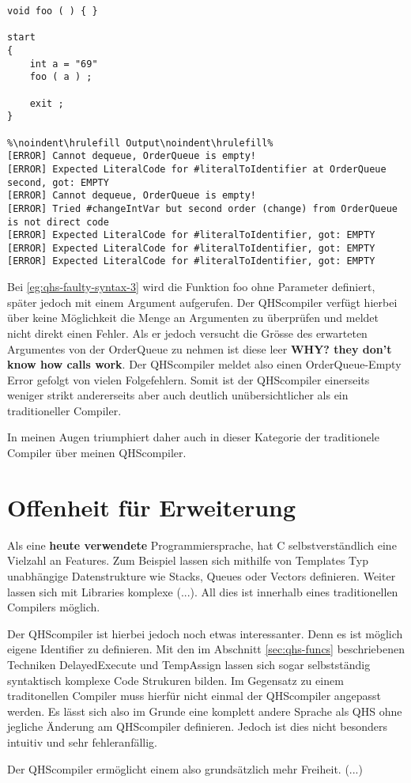 \begin{lstlisting}[language=QHS, caption=QHS mit fehlerhaftem Syntax, label=eg:qhs-faulty-syntax-3]
void foo ( ) { }

start
{
    int a = "69" 
    foo ( a ) ;

    exit ;
}

%\noindent\hrulefill Output\noindent\hrulefill%
[ERROR] Cannot dequeue, OrderQueue is empty!
[ERROR] Expected LiteralCode for #literalToIdentifier at OrderQueue second, got: EMPTY
[ERROR] Cannot dequeue, OrderQueue is empty!
[ERROR] Tried #changeIntVar but second order (change) from OrderQueue is not direct code
[ERROR] Expected LiteralCode for #literalToIdentifier, got: EMPTY
[ERROR] Expected LiteralCode for #literalToIdentifier, got: EMPTY
[ERROR] Expected LiteralCode for #literalToIdentifier, got: EMPTY
\end{lstlisting}

Bei \ref{eg:qhs-faulty-syntax-3} wird die Funktion foo ohne Parameter definiert, später jedoch mit einem Argument aufgerufen. Der QHScompiler verfügt hierbei über keine Möglichkeit die Menge an Argumenten zu überprüfen
und meldet nicht direkt einen Fehler. Als er jedoch versucht die Grösse des erwarteten Argumentes von der OrderQueue zu nehmen ist diese leer \textbf{WHY? they don't know how calls work}.
Der QHScompiler meldet also einen OrderQueue-Empty Error gefolgt von vielen Folgefehlern.
Somit ist der QHScompiler einerseits weniger strikt andererseits aber auch deutlich unübersichtlicher als ein traditioneller Compiler.

In meinen Augen triumphiert daher auch in dieser Kategorie der traditionele Compiler über meinen QHScompiler.

\section{Offenheit für Erweiterung}
Als eine \textbf{heute verwendete} Programmiersprache, hat C selbstverständlich eine Vielzahl an Features. Zum Beispiel lassen sich mithilfe von Templates Typ unabhängige Datenstrukture wie Stacks, Queues oder Vectors definieren.
Weiter lassen sich mit Libraries komplexe (...). All dies ist innerhalb eines traditionellen Compilers möglich.

Der QHScompiler ist hierbei jedoch noch etwas interessanter. Denn es ist möglich eigene Identifier zu definieren. Mit den im Abschnitt \ref{sec:qhs-funcs} beschriebenen Techniken DelayedExecute und TempAssign
lassen sich sogar selbstständig syntaktisch komplexe Code Strukuren bilden. Im Gegensatz zu einem traditonellen Compiler muss hierfür nicht einmal der QHScompiler angepasst werden.
Es lässt sich also im Grunde eine komplett andere Sprache als QHS ohne jegliche Änderung am QHScompiler definieren. Jedoch ist dies nicht besonders intuitiv und sehr fehleranfällig.

Der QHScompiler ermöglicht einem also grundsätzlich mehr Freiheit. (...)
